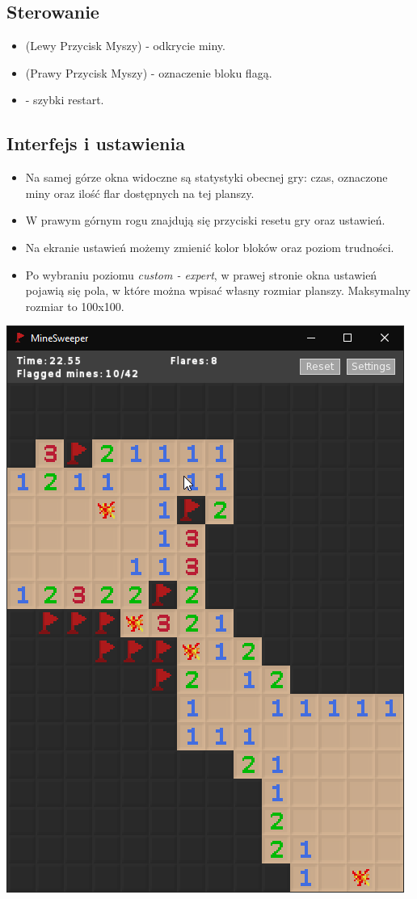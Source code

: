 \documentclass[12pt,a4paper]{article}
\begin{document}
\subsection{Sterowanie}
\begin{itemize}
\item {} (Lewy Przycisk Myszy) - odkrycie miny.
\item {} (Prawy Przycisk Myszy) - oznaczenie bloku flagą.
\item {} - szybki restart.
\end{itemize}

\newpage

\subsection{Interfejs i ustawienia}
\begin{itemize}
\item Na samej górze okna widoczne są statystyki obecnej gry: czas, oznaczone miny oraz ilość flar dostępnych na tej planszy.
\item W prawym górnym rogu znajdują się przyciski resetu gry oraz ustawień.
\item Na ekranie ustawień możemy zmienić kolor bloków oraz poziom trudności.
\item Po wybraniu poziomu \textit{custom - expert}, w prawej stronie okna ustawień pojawią się pola, w które można wpisać własny rozmiar planszy. Maksymalny rozmiar to 100x100.
\end{itemize}
\includegraphics[scale=0.45]{game}
\end{document}
